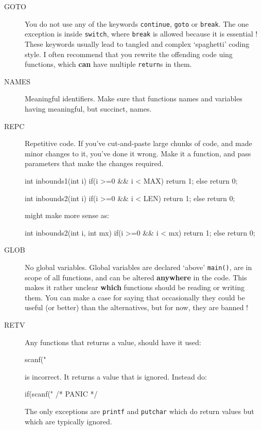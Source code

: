 \begin{description}
\item[GOTO] You do not use any of the keywords \verb^continue^, \verb^goto^ or \verb^break^. The one exception is inside \verb^switch^, where \verb^break^ is allowed because it is essential !
These keywords usually lead to tangled and complex `spaghetti' coding style.
I often recommend that you rewrite the offending code uing functions, which {\bf can} have multiple \verb^return^s
in them.

\item[NAMES] Meaningful identifiers. Make sure that functions names and variables having meaningful, but succinct,  names.

\item[REPC] Repetitive code. If you've cut-and-paste large chunks of code, and made minor changes to it, you've done it wrong. Make it a function, and pass parameters that make the changes required.
\begin{codesnippet}
int inbounds1(int i){
   if(i >=0 && i < MAX){
      return 1;
   }
   else{ 
      return 0;
   }
}

int inbounds2(int i){
   if(i >=0 && i < LEN){
      return 1;
   }
   else{ 
      return 0;
   }
}
\end{codesnippet}
might make more sense as:
\begin{codesnippet}
int inbounds2(int i, int mx){
   if(i >=0 && i < mx){
      return 1;
   }
   else{ 
      return 0;
   }
}
\end{codesnippet}

\item[GLOB] No global variables. Global variables are declared `above' \verb^main()^, are in scope of all functions, and can be altered {\bf anywhere} in the code. This makes it rather unclear {\bf which} functions should be reading or writing them. You can make a case for saying that occasionally they could be useful (or better) than the alternatives, but for now, they are banned !

\item[RETV] Any functions that returns a value, should have it used:
\begin{codesnippet}
scanf("%
\end{codesnippet}
is incorrect. It returns a value that is ignored. Instead do:
\begin{codesnippet}
	if(scanf("%
	   /* PANIC */
\end{codesnippet}

The only exceptions are \verb^printf^ and \verb^putchar^ which do return values but
which are typically ignored.


\end{description}
